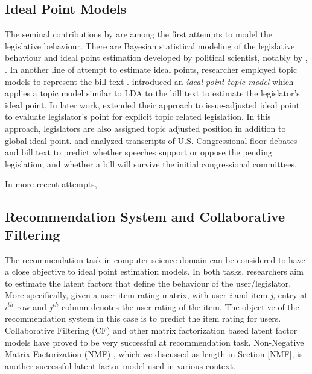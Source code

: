 \subsection{Ideal Point Models}
The seminal contributions by \citet{pool_rosenthal_1985, pool_rosenthal_1991} are among the first attempts to model the legislative behaviour. There are Bayesian statistical modeling of the legislative behaviour and ideal point estimation developed by political scientist, notably by \citet{Clinton2004, Clinton2012}, \citet{heckman1997}. In another line of attempt to estimate ideal points, researcher employed topic models to represent the bill text \cite{Gerrish2011, Gua}. \citet{Gerrish2011} introduced an \textit{ideal point topic model} which applies a topic model similar to LDA \cite{Blei2003} to the bill text to estimate the legislator's ideal point. In later work, \citet{Gerrish2012HowTV} extended their approach to issue-adjusted ideal point to evaluate legislator's point for explicit topic related legislation. In this approach, legislators are also assigned topic adjusted position in addition to global ideal point. \citet{yano_tae_2012} and \citet{DBLP:journals/corr/abs-cs-0607062} analyzed transcripts of U.S. Congressional floor debates and bill text to predict whether speeches support or oppose the pending legislation, and whether a bill will survive the initial congressional committees.

In more recent attempts, \cite{Kraft} 

\subsection{Recommendation System and Collaborative Filtering}
The recommendation task in computer science domain can be considered to have a close objective to ideal point estimation models. In both tasks, researchers aim to estimate the latent factors that define the behaviour of the user/legislator. More specifically, given a user-item rating matrix, with user \textit{i} and item \textit{j}, entry at \textit{$i^{th}$} row and  \textit{$j^{th}$} column denotes the user rating of the item. The objective of the recommendation system in this case is to predict the item rating for users. Collaborative Filtering (CF) \cite{Herlocker:1999:AFP:312624.312682, Salakhutdinov:2007:RBM:1273496.1273596} and other matrix factorization based latent factor models \cite{koren_2009,Salakhutdinov:2007:PMF:2981562.2981720} have proved to be very successful at recommendation task. Non-Negative Matrix Factorization (NMF) \cite{Lee1999}, which we discussed as length in Section \ref{NMF}, is another successful latent factor model used in various context. 




